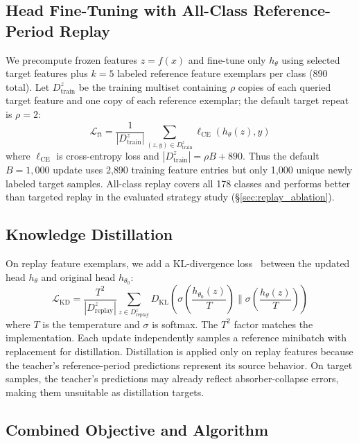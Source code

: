 \documentclass[journal]{IEEEtran}
\begin{document}
\subsection{Head Fine-Tuning with All-Class Reference-Period Replay}
\label{sec:ft_replay}

We precompute frozen features $z=f(x)$ and fine-tune only $h_\theta$ using selected target features plus $k{=}5$ labeled reference feature exemplars per class (890 total). Let $D_{\text{train}}^z$ be the training multiset containing $\rho$ copies of each queried target feature and one copy of each reference exemplar; the default target repeat is $\rho{=}2$:
\begin{equation}
  \mathcal{L}_{\text{ft}} = \frac{1}{|D_{\text{train}}^z|} \sum_{(z,y)\in D_{\text{train}}^z} \ell_{\text{CE}}(h_\theta(z), y)
\end{equation}
where $\ell_{\text{CE}}$ is cross-entropy loss and $|D_{\text{train}}^z|=\rho B+890$. Thus the default $B{=}1{,}000$ update uses 2{,}890 training feature entries but only 1{,}000 unique newly labeled target samples.
All-class replay covers all 178 classes and performs better than targeted replay in the evaluated strategy study (\S\ref{sec:replay_ablation}).

\subsection{Knowledge Distillation}
\label{sec:distill}

On replay feature exemplars, we add a KL-divergence loss~\cite{hinton2015distilling} between the updated head $h_\theta$ and original head $h_{\theta_0}$:
\begin{equation}
  \mathcal{L}_{\text{KD}} = \frac{T^2}{|D_{\text{replay}}^z|} \!\sum_{z \in D_{\text{replay}}^z} D_{\text{KL}}\!\!\left(\sigma\!\!\left(\frac{h_{\theta_0}(z)}{T}\right) \!\Big\|\! \sigma\!\!\left(\frac{h_\theta(z)}{T}\right)\!\right)
\end{equation}
where $T$ is the temperature and $\sigma$ is softmax. The $T^2$ factor matches the implementation. Each update independently samples a reference minibatch with replacement for distillation.
Distillation is applied only on replay features because the teacher's reference-period predictions represent its source behavior.
On target samples, the teacher's predictions may already reflect absorber-collapse errors, making them unsuitable as distillation targets.

\subsection{Combined Objective and Algorithm}
\end{document}
